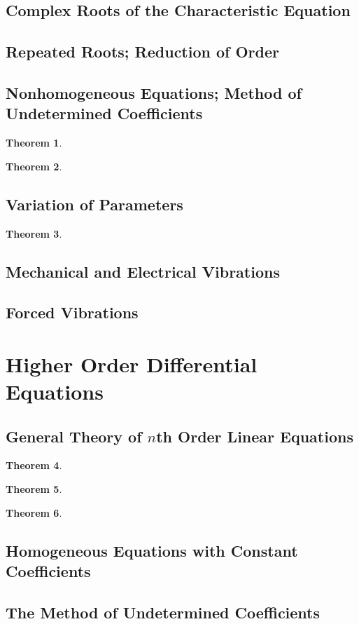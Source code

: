 \documentclass[10pt]{report}
\newtheorem{thm3}{Theorem}[subsection]
\begin{document}
\subsection{Complex Roots of the Characteristic Equation}
\subsection{Repeated Roots; Reduction of Order}
\subsection{Nonhomogeneous Equations; Method of Undetermined Coefficients}
\begin{thm3}
\end{thm3}
\begin{thm3}
\end{thm3}
\subsection{Variation of Parameters}
\begin{thm3}
\end{thm3}
\subsection{Mechanical and Electrical Vibrations}
\subsection{Forced Vibrations}
\section{Higher Order Differential Equations}
\subsection{General Theory of $n$th Order Linear Equations}
\begin{thm3}
\end{thm3}
\begin{thm3}
\end{thm3}
\begin{thm3}
\end{thm3}
\subsection{Homogeneous Equations with Constant Coefficients}
\subsection{The Method of Undetermined Coefficients}
\end{document}
